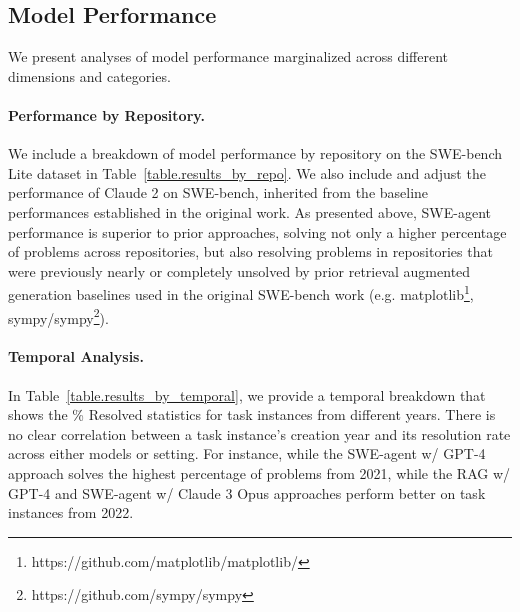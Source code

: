 \subsection{Model Performance}
\label{appx:results:model_performance}
We present analyses of model performance marginalized across different dimensions and categories.



\paragraph{Performance by Repository.}
We include a breakdown of model performance by repository on the SWE-bench Lite dataset in Table~\ref{table.results_by_repo}.
We also include and adjust the performance of Claude 2 on SWE-bench, inherited from the baseline performances established in the original work.
As presented above, SWE-agent performance is superior to prior approaches, solving not only a higher percentage of problems across repositories, but also resolving problems in repositories that were previously nearly or completely unsolved by prior retrieval augmented generation baselines used in the original SWE-bench work (e.g. matplotlib\footnote{https://github.com/matplotlib/matplotlib/}, sympy/sympy\footnote{https://github.com/sympy/sympy}).



\paragraph{Temporal Analysis.}
In Table~\ref{table.results_by_temporal}, we provide a temporal breakdown that shows the \% Resolved statistics for task instances from different years.
There is no clear correlation between a task instance's creation year and its resolution rate across either models or setting.
For instance, while the SWE-agent w/ GPT-4 approach solves the highest percentage of problems from 2021, while the RAG w/ GPT-4 and SWE-agent w/ Claude 3 Opus approaches perform better on task instances from 2022.